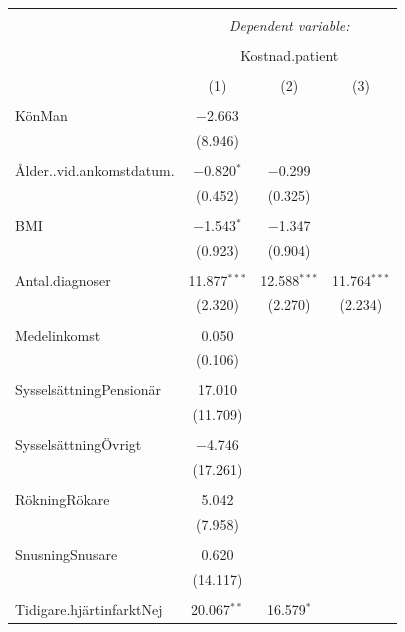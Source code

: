\begin{table}[!htbp] \centering 
  \caption{} 
  \label{} 
\begin{tabular}{@{\extracolsep{5pt}}lccc} 
\\[-1.8ex]\hline 
\hline \\[-1.8ex] 
 & \multicolumn{3}{c}{\textit{Dependent variable:}} \\ 
\cline{2-4} 
\\[-1.8ex] & \multicolumn{3}{c}{Kostnad.patient} \\ 
\\[-1.8ex] & (1) & (2) & (3)\\ 
\hline \\[-1.8ex] 
 KönMan & $-$2.663 &  &  \\ 
  & (8.946) &  &  \\ 
  & & & \\ 
 Ålder..vid.ankomstdatum. & $-$0.820$^{*}$ & $-$0.299 &  \\ 
  & (0.452) & (0.325) &  \\ 
  & & & \\ 
 BMI & $-$1.543$^{*}$ & $-$1.347 &  \\ 
  & (0.923) & (0.904) &  \\ 
  & & & \\ 
 Antal.diagnoser & 11.877$^{***}$ & 12.588$^{***}$ & 11.764$^{***}$ \\ 
  & (2.320) & (2.270) & (2.234) \\ 
  & & & \\ 
 Medelinkomst & 0.050 &  &  \\ 
  & (0.106) &  &  \\ 
  & & & \\ 
 SysselsättningPensionär & 17.010 &  &  \\ 
  & (11.709) &  &  \\ 
  & & & \\ 
 SysselsättningÖvrigt & $-$4.746 &  &  \\ 
  & (17.261) &  &  \\ 
  & & & \\ 
 RökningRökare & 5.042 &  &  \\ 
  & (7.958) &  &  \\ 
  & & & \\ 
 SnusningSnusare & 0.620 &  &  \\ 
  & (14.117) &  &  \\ 
  & & & \\ 
 Tidigare.hjärtinfarktNej & 20.067$^{**}$ & 16.579$^{*}$ &  \\ 

\end{tabular}
\end{table}
